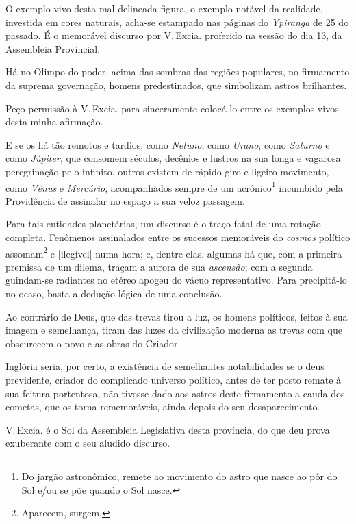 O exemplo vivo desta mal delineada figura, o exemplo notável da
realidade, investida em cores naturais, acha-se estampado nas páginas do
\emph{Ypiranga} de 25 do passado. É o memorável discurso por V.\,Excia.
proferido na sessão do dia 13, da Assembleia Provincial.

Há no Olimpo do poder, acima das sombras das regiões populares, no
firmamento da suprema governação, homens predestinados, que simbolizam
astros brilhantes.

Peço permissão à V.\,Excia. para sinceramente colocá-lo entre os exemplos
vivos desta minha afirmação.

E se os há tão remotos e tardios, como \emph{Netuno}, como \emph{Urano},
como \emph{Saturno} e como \emph{Júpiter}, que consomem séculos,
decênios e lustros na sua longa e vagarosa peregrinação pelo infinito,
outros existem de rápido giro e ligeiro movimento, como \emph{Vênus} e
\emph{Mercúrio}, acompanhados sempre de um acrônico\footnote{Do jargão
  astronômico, remete ao movimento do astro que nasce ao pôr do Sol e/ou
  se põe quando o Sol nasce.} incumbido pela Providência de assinalar no
espaço a sua veloz passagem.

Para tais entidades planetárias, um discurso é o traço fatal de uma
rotação completa. Fenômenos assinalados entre os sucessos memoráveis do
\emph{cosmos} político assomam\footnote{Aparecem, surgem.} e
{[}ilegível{]} numa hora; e, dentre elas, algumas há que, com a primeira
premissa de um dilema, traçam a aurora de sua \emph{ascensão}; com a
segunda guindam-se radiantes no etéreo apogeu do vácuo representativo.
Para precipitá-lo no ocaso, basta a dedução lógica de uma conclusão.

Ao contrário de Deus, que das trevas tirou a luz, os homens políticos,
feitos à sua imagem e semelhança, tiram das luzes da civilização moderna
as trevas com que obscurecem o povo e as obras do Criador.

Inglória seria, por certo, a existência de semelhantes notabilidades se
o deus previdente, criador do complicado universo político, antes de ter
posto remate à sua feitura portentosa, não tivesse dado aos astros deste
firmamento a cauda dos cometas, que os torna rememoráveis, ainda depois
do seu desaparecimento.

V.\,Excia. é o Sol da Assembleia Legislativa desta província, do que deu
prova exuberante com o seu aludido discurso.

